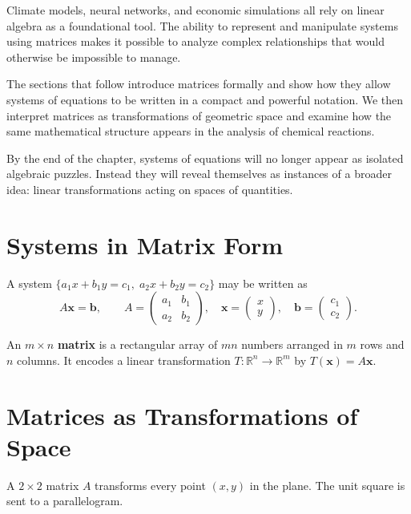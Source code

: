 \documentclass[11pt, openany]{book}
\theoremstyle{plain}
\theoremstyle{definition}
\theoremstyle{remark}
\newcommand{\R}{\mathbb{R}}
\begin{document}
Climate models, neural networks, and economic simulations all rely on
linear algebra as a foundational tool. The ability to represent and
manipulate systems using matrices makes it possible to analyze complex
relationships that would otherwise be impossible to manage.

\medskip

The sections that follow introduce matrices formally and show how they
allow systems of equations to be written in a compact and powerful
notation. We then interpret matrices as transformations of geometric
space and examine how the same mathematical structure appears in the
analysis of chemical reactions.

By the end of the chapter, systems of equations will no longer appear as
isolated algebraic puzzles. Instead they will reveal themselves as
instances of a broader idea: linear transformations acting on spaces of
quantities.

\section{Systems in Matrix Form}

A system $\{a_1x+b_1y=c_1,\;a_2x+b_2y=c_2\}$ may be written as
\[
  A\mathbf{x}=\mathbf{b},
  \qquad
  A=\begin{pmatrix}a_1&b_1\\a_2&b_2\end{pmatrix},\quad
  \mathbf{x}=\begin{pmatrix}x\\y\end{pmatrix},\quad
  \mathbf{b}=\begin{pmatrix}c_1\\c_2\end{pmatrix}.
\]

\begin{mydefinition}[Matrix]
An $m\times n$ \textbf{matrix} is a rectangular array of $mn$ numbers
arranged in $m$ rows and $n$ columns. It encodes a linear transformation
$T:\R^n\to\R^m$ by $T(\mathbf{x})=A\mathbf{x}$.
\end{mydefinition}

\section{Matrices as Transformations of Space}

A $2\times2$ matrix $A$ transforms every point $(x,y)$ in the plane. The
unit square is sent to a parallelogram.
\end{document}
